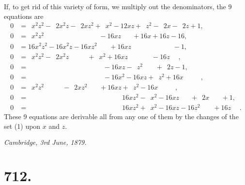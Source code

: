 \documentclass[11pt,a4paper]{book}
\begin{document}
If, to get rid of this variety of form, we multiply out the denominators, the 9 equations are
\begin{align*}
0&=\phantom{1}x^2z^2-\phantom{1}2x^2z-\phantom{1}2xz^2+\phantom{1}x^2-12xz+\phantom{1}z^2-\phantom{1}2x-\phantom{1}2z+1,\\
0&=\phantom{1}x^2z^2\phantom{-2x^2z-2xz^2+x^2}-16xz\phantom{+z^2}+16x+16z-16,\\
0&=16x^2z^2-16x^2z-16xz^2\phantom{+x^2}+16xz\phantom{+z^2-2x-2z}-1,\\
0&=\phantom{1}x^2z^2-\phantom{1}2x^2z\phantom{-2xz^2}+\phantom{1}x^2+16xz\phantom{+z^2}\phantom{-2x}-16z\phantom{+1},\\
0&=\phantom{16x^2z^2}\phantom{-16x^2z}\phantom{-16xz^2}\phantom{+x^2}-16xz-\phantom{1}z^2\phantom{-2x}+\phantom{1}2z-1,\\
0&=\phantom{16x^2z^2}\phantom{-16x^2z}\phantom{-16xz^2}\phantom{+x^2}-16x^2-16xz+\phantom{1}z^2+16x\phantom{+1}\phantom{-1},\\
0&=\phantom{1}x^2z^2\phantom{-2x^2z}-\phantom{1}2xz^2\phantom{+x^2}+16xz+\phantom{1}z^2-16x\phantom{+1}\phantom{-1},\\
0&=\phantom{16x^2z^2}\phantom{-16x^2z}\phantom{+16xz^2}\phantom{+x^2}\phantom{-16xz}
  16xz^2-\phantom{1}x^2-16xz\phantom{+z^2}+\phantom{1}2x\phantom{+2z}+1,\\
0&=\phantom{16x^2z^2}\phantom{-16x^2z}\phantom{+16xz^2}\phantom{+x^2}\phantom{-16xz}
  16xz^2+\phantom{1}x^2-16xz-16z^2\phantom{+2x}+16z\phantom{+1}.
\end{align*}
These 9 equations are derivable all from any one of them by the changes of the set (1) upon $x$ and $z$.

\begin{flushright}
\textit{Cambridge, 3rd June, 1879.}
\end{flushright}

\vspace{2em}
\noindent\dotfill
\clearpage


\setcounter{page}{27}

\section*{712.}
\end{document}
